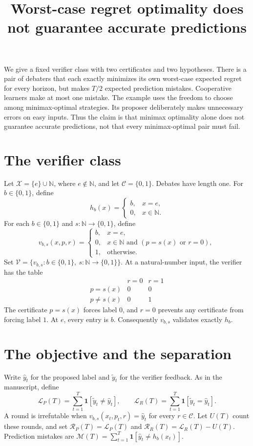 \documentclass[11pt]{article}
\title{Worst-case regret optimality does not guarantee accurate predictions}
\author{}
\date{}
\newcommand{\ind}{\mathbf 1}
\newcommand{\V}{\mathcal V}
\newcommand{\C}{\mathcal C}
\newcommand{\X}{\mathcal X}
\newcommand{\Lo}{\mathcal L}
\newcommand{\Reg}{\mathcal R}
\newcommand{\Mi}{\mathcal M}
\begin{document}
\maketitle

We give a fixed verifier class with two certificates and two hypotheses.
There is a pair of debaters that each exactly minimizes its own worst-case
expected regret for every horizon, but makes $T/2$ expected prediction
mistakes. Cooperative learners make at most one mistake.
The example uses the freedom to choose among minimax-optimal strategies.
Its proposer deliberately makes unnecessary errors on easy inputs.
Thus the claim is that minimax optimality alone does not guarantee accurate
predictions, not that every minimax-optimal pair must fail.

\section{The verifier class}

Let $\X=\{e\}\cup\mathbb N$, where $e\notin\mathbb N$, and let
$\C=\{0,1\}$. Debates have length one. For $b\in\{0,1\}$, define
\[
h_b(x)=
\begin{cases}
b,&x=e,\\
0,&x\in\mathbb N.
\end{cases}
\]
For each $b\in\{0,1\}$ and $s:\mathbb N\to\{0,1\}$, define
\[
v_{b,s}(x,p,r)=
\begin{cases}
b,&x=e,\\
0,&x\in\mathbb N\text{ and }(p=s(x)\text{ or }r=0),\\
1,&\text{otherwise}.
\end{cases}
\]
Set $\V=\{v_{b,s}:b\in\{0,1\},\ s:\mathbb N\to\{0,1\}\}$.
At a natural-number input, the verifier has the table
\[
\begin{array}{c|cc}
 &r=0&r=1\\\hline
p=s(x)&0&0\\
p\ne s(x)&0&1
\end{array}
\]
The certificate $p=s(x)$ forces label $0$, and $r=0$ prevents any
certificate from forcing label $1$. At $e$, every entry is $b$.
Consequently $v_{b,s}$ validates exactly $h_b$.

\section{The objective and the separation}

Write $\hat y_t$ for the proposed label and $\tilde y_t$ for the verifier
feedback. As in the manuscript, define
\[
\Lo_P(T)=\sum_{t=1}^T\ind[\tilde y_t\ne\hat y_t],
\qquad
\Lo_R(T)=\sum_{t=1}^T\ind[\tilde y_t=\hat y_t].
\]
A round is irrefutable when $v_{b,s}(x_t,p_t,r)=\hat y_t$ for every
$r\in\C$. Let $U(T)$ count these rounds, and set
$\Reg_P(T)=\Lo_P(T)$ and $\Reg_R(T)=\Lo_R(T)-U(T)$.
Prediction mistakes are
$\Mi(T)=\sum_{t=1}^T\ind[\hat y_t\ne h_b(x_t)]$.
\end{document}
